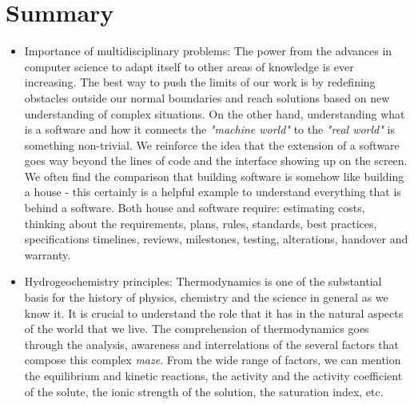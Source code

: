 \section{Summary}
\begin{itemize}
\item Importance of multidisciplinary problems: The power from the advances in computer science to adapt itself to other areas of knowledge is ever increasing. The best way to push the limits of our work is by redefining obstacles outside our normal boundaries and reach solutions based on new understanding of complex situations. On the other hand, understanding what is a software and how it connects the \emph{"machine world"} to the \emph{"real world"} is something non-trivial. We reinforce the idea that the extension of a software goes way beyond the lines of code and the interface showing up on the screen. We often find the comparison that building software is somehow like building a house - this certainly is a helpful example to understand everything that is behind a software. Both house and software require: estimating costs, thinking about the requirements, plans, rules, standards, best practices, specifications timelines, reviews, milestones, testing, alterations, handover and warranty.
\item Hydrogeochemistry principles: Thermodynamics is one of the substantial basis for the history of physics, chemistry and the science in general as we know it. It is crucial to understand the role that it has in the natural aspects of the world that we live. The comprehension of thermodynamics goes through the analysis, awareness and interrelations of the several factors that compose this complex \emph{maze}. From the wide range of factors, we can mention the equilibrium and kinetic reactions, the activity and the activity coefficient of the solute, the ionic strength of the solution, the saturation index, etc.
\end{itemize}